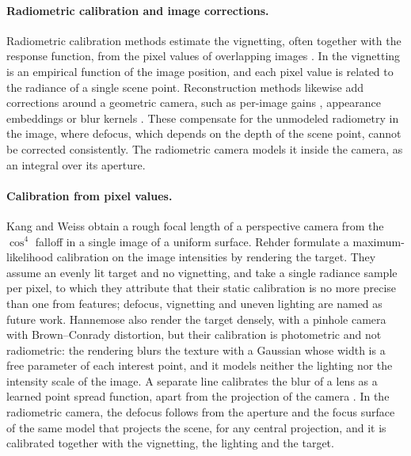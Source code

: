 \paragraph{Radiometric calibration and image corrections.} Radiometric calibration methods
estimate the vignetting, often together with the response function,
from the pixel values of overlapping images
\cite{Kim-PAMI-2008,single-image-vignetting,direct-sparse-odometry}.
In \cite{Kim-PAMI-2008,xian2023neurallens} the vignetting is an empirical function of the image position, and
each pixel value is related to the radiance of a single scene point.
Reconstruction methods likewise add corrections around a geometric
camera, such as per-image gains \cite{brown2007automatic}, appearance
embeddings \cite{martinbrualla2021nerfw} or blur kernels
\cite{ma2022deblurnerf}. These compensate for the unmodeled radiometry in the image, where
defocus, which depends on the depth of the scene point, cannot be
corrected consistently. The radiometric camera models it inside the
camera, as an integral over its aperture.

\paragraph{Calibration from pixel values.} Kang and Weiss
\cite{kang2000calibrate} obtain a rough focal length of a perspective
camera from the $\cos^4$ falloff in a single image of a uniform
surface. Rehder \etal \cite{rehder2017direct} formulate a
maximum-likelihood calibration on the image intensities by rendering
the target. They assume an evenly lit target and no vignetting, and
take a single radiance sample per pixel, to which they attribute that
their static calibration is no more precise than one from features;
defocus, vignetting and uneven lighting are named as future work.
Hannemose \etal \cite{Hannemose_2019} also render the target densely,
with a pinhole camera with Brown--Conrady distortion, but their
calibration is photometric and not radiometric: the rendering blurs
the texture with a Gaussian whose width is a free parameter of each
interest point, and it models neither the lighting nor the intensity
scale of the image. A separate line calibrates the
blur of a lens as a learned point spread function, apart from the
projection of the camera \cite{lin2023blurfields}. In the radiometric
camera, the defocus follows from the aperture and the focus surface of
the same model that projects the scene, for any central projection,
and it is calibrated together with the vignetting, the lighting and
the target.

